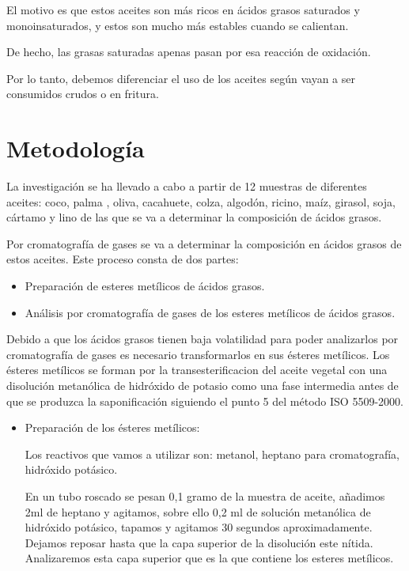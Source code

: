 \documentclass[a4paper,12pt]{article}
\begin{document}
\begin{multicols}{2}
El motivo es que estos aceites son más ricos en ácidos grasos saturados y monoinsaturados, y estos son mucho más estables cuando se calientan.

De hecho, las grasas saturadas apenas pasan por esa reacción de oxidación.

Por lo tanto, debemos diferenciar el uso de los aceites según vayan a ser consumidos crudos o en fritura.

\section{Metodología}

La investigación se ha llevado a cabo a partir de 12 muestras de diferentes aceites: coco, palma , oliva, cacahuete, colza, algodón, ricino, maíz, girasol, soja, cártamo y lino de las que se va a determinar la composición de ácidos grasos.

Por cromatografía de gases se va a determinar la composición en ácidos grasos de estos aceites. Este proceso consta de dos partes: 
\begin{itemize}
\item Preparación de esteres metílicos de ácidos grasos.

\item Análisis por cromatografía de gases de los esteres metílicos de ácidos grasos.
\end{itemize}

Debido a que los ácidos grasos tienen baja volatilidad para poder analizarlos por cromatografía de gases es necesario transformarlos en sus ésteres metílicos. Los ésteres metílicos se forman por la transesterificacion del aceite vegetal con una disolución metanólica de hidróxido de potasio como una fase intermedia antes de que se produzca la saponificación siguiendo el punto 5 del método ISO 5509-2000.
\begin{itemize}

\item Preparación de los ésteres metílicos:

Los reactivos que vamos a utilizar son: metanol, heptano para cromatografía, hidróxido potásico.

En un tubo roscado se pesan 0,1 gramo de la muestra de aceite, añadimos 2ml de heptano y agitamos, sobre ello 0,2 ml de solución metanólica de hidróxido potásico, tapamos  y agitamos 30 segundos aproximadamente. Dejamos reposar hasta que la capa superior de la disolución este nítida. Analizaremos esta capa superior que es la que contiene los esteres metílicos.


\end{itemize}
\end{multicols}
\end{document}
